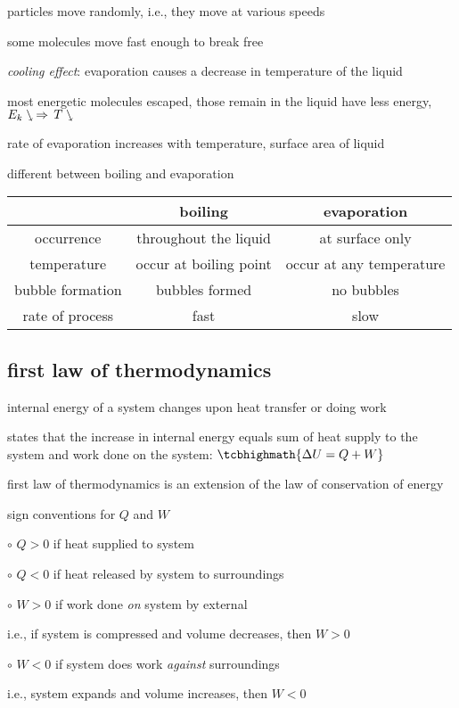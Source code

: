 particles move randomly, i.e., they move at various speeds

some molecules move fast enough to break free

\cmt \emph{cooling effect}: evaporation causes a decrease in temperature of the liquid

most energetic molecules escaped, those remain in the liquid have less energy, $E_k \ssearrow \, \Rightarrow \, T \ssearrow$

\cmt rate of evaporation increases with temperature, surface area of liquid

\cmt different between boiling and evaporation

\begin{center}
	\begin{tabular}{|c|c|c|}
		\hline 
		& boiling & evaporation \\ 
		\hline 
		occurrence & throughout the liquid & at surface only \\ 
		\hline 
		temperature & occur at boiling point & occur at any temperature \\ 
		\hline 
		bubble formation & bubbles formed & no bubbles \\ 
		\hline 
		rate of process & fast & slow \\ 
		\hline 
	\end{tabular} 
\end{center}

\subsection{first law of thermodynamics}

internal energy of a system changes upon heat transfer or doing work

\begin{ilight}
	 states that the increase in internal energy equals sum of heat supply to the system and work done on the system: $\tcbhighmath{\Delta U = Q +  W}$
\end{ilight}

\cmt first law of thermodynamics is an extension of the law of conservation of energy

\cmt sign conventions for $Q$ and $W$

\begin{compactitem}
	\item[$\circ$] $Q>0$ if heat supplied to system
	
	\item[$\circ$] $Q<0$ if heat released by system to surroundings
	
	\item[$\circ$] $W>0$ if work done \emph{on} system by external
	
	i.e., if system is compressed and volume decreases, then $W>0$
	
	\item[$\circ$] $W<0$ if system does work \emph{against} surroundings
	
	i.e., system expands and volume increases, then $W<0$
	
\end{compactitem}


